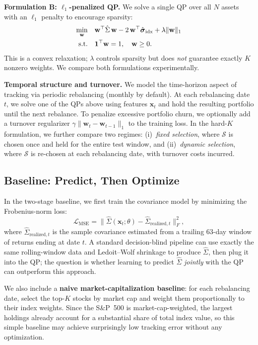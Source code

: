 \documentclass[11pt]{article}
\begin{document}
\textbf{Formulation B: $\ell_1$-penalized QP.}\; We solve a single QP over all $N$ assets with an $\ell_1$ penalty to encourage sparsity:
\begin{align}
  \min_{\mathbf{w}} \quad & \mathbf{w}^\top \hat{\Sigma}\, \mathbf{w}
    - 2\,\mathbf{w}^\top \hat{\boldsymbol{\sigma}}_{\mathrm{idx}}
    + \lambda \|\mathbf{w}\|_1 \label{eq:l1}\\
  \text{s.t.} \quad & \mathbf{1}^\top \mathbf{w} = 1, \quad
    \mathbf{w} \geq 0. \notag
\end{align}
This is a convex relaxation; $\lambda$ controls sparsity but does \emph{not} guarantee exactly $K$ nonzero weights. We compare both formulations experimentally.

\textbf{Temporal structure and turnover.}\; We model the time-horizon aspect of tracking via periodic rebalancing (monthly by default). At each rebalancing date $t$, we solve one of the QPs above using features $\mathbf{x}_t$ and hold the resulting portfolio until the next rebalance. To penalize excessive portfolio churn, we optionally add a turnover regularizer $\gamma \|\mathbf{w}_t - \mathbf{w}_{t-1}\|_1$ to the training loss. In the hard-$K$ formulation, we further compare two regimes: (i)~\emph{fixed selection}, where $\mathcal{S}$ is chosen once and held for the entire test window, and (ii)~\emph{dynamic selection}, where $\mathcal{S}$ is re-chosen at each rebalancing date, with turnover costs incurred.

\subsection{Baseline: Predict, Then Optimize}

In the two-stage baseline, we first train the covariance model by minimizing the Frobenius-norm loss:
\[
  \mathcal{L}_{\mathrm{MSE}} = \bigl\|\hat{\Sigma}(\mathbf{x}_t;\theta) - \hat{\Sigma}_{\mathrm{realized},t}\bigr\|_F^2,
\]
where $\hat{\Sigma}_{\mathrm{realized},t}$ is the sample covariance estimated from a trailing 63-day window of returns ending at date $t$. A standard decision-blind pipeline can use exactly the same rolling-window data and Ledoit--Wolf shrinkage to produce $\hat{\Sigma}$, then plug it into the QP; the question is whether learning to predict $\hat{\Sigma}$ \emph{jointly} with the QP can outperform this approach.

We also include a \textbf{naive market-capitalization baseline}: for each rebalancing date, select the top-$K$ stocks by market cap and weight them proportionally to their index weights. Since the S\&P~500 is market-cap-weighted, the largest holdings already account for a substantial share of total index value, so this simple baseline may achieve surprisingly low tracking error without any optimization.
\end{document}
